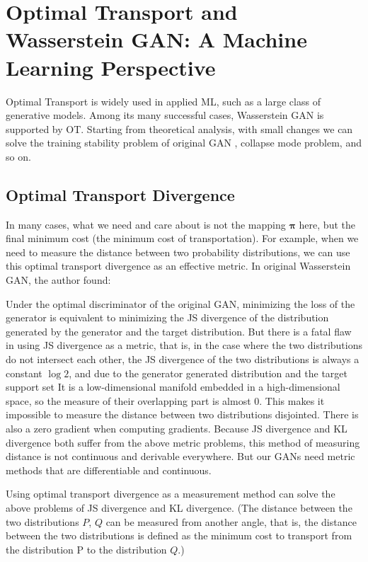 
\vspace{10ex}
\section{Optimal Transport and Wasserstein GAN: A Machine Learning Perspective}
Optimal Transport is widely used in applied ML, such as a large class of generative models. Among its many successful cases, Wasserstein GAN is supported by OT. Starting from theoretical analysis,  with small changes we can solve the training stability problem of original GAN , collapse mode problem, and so on. 

\subsection{Optimal Transport Divergence}
In many cases, what we need and care about is not the mapping $\mathbf{\pi}$ here, but the final minimum cost (the minimum cost of transportation). For example, when we need to measure the distance between two probability distributions, we can use this optimal transport divergence as an effective metric. In original Wasserstein GAN\cite{Arjovsky2017}, the author found:

Under the optimal discriminator of the original GAN, minimizing the loss of the generator is equivalent to minimizing the JS divergence of the distribution generated by the generator and the target distribution. But there is a fatal flaw in using JS divergence as a metric, that is, in the case where the two distributions do not intersect each other, the JS divergence of the two distributions is always a constant $\log 2$,  and due to the generator generated distribution and the target support set It is a low-dimensional manifold embedded in a high-dimensional space, so the measure of their overlapping part is almost 0. This makes it impossible to measure the distance between two distributions disjointed. There is also a zero gradient when computing gradients. Because JS divergence and KL divergence both suffer from the above metric problems, this method of measuring distance is not continuous and derivable everywhere. But our GANs need metric methods that are differentiable and continuous. 

Using optimal transport divergence as a measurement method can solve the above problems of JS divergence and KL divergence. (The distance between the two distributions $P$, $Q$ can be measured from another angle, that is, the distance between the two distributions is defined as the minimum cost to transport from the distribution P to the distribution $Q$.)

